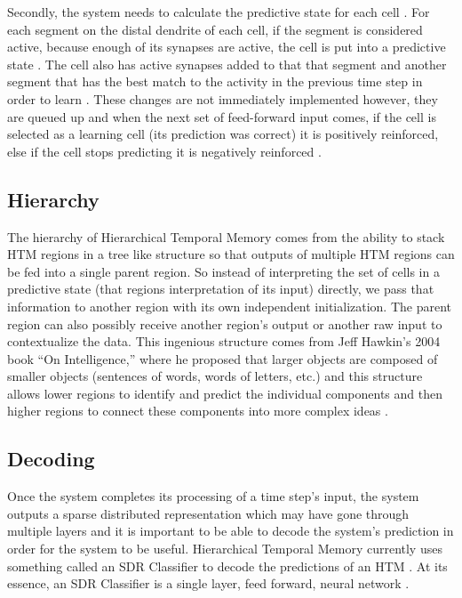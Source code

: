 \documentclass[fleqn,notitlepage,minimal]{article}
\begin{document}
	Secondly, the system needs to calculate the predictive state for each cell \cite{Whitepaper}. For each segment on the distal dendrite of each cell, if the segment is considered active, because enough of its synapses are active, the cell is put into a predictive state \cite{Principles}. The cell also has active synapses added to that that segment and another segment that has the best match to the activity in the previous time step in order to learn \cite{Whitepaper}. These changes are not immediately implemented however, they are queued up and when the next set of feed-forward input comes, if the cell is selected as a learning cell (its prediction was correct) it is positively reinforced, else if the cell stops predicting it is negatively reinforced \cite{Whitepaper}.
	
	\subsection{Hierarchy}
	
	The hierarchy of Hierarchical Temporal Memory comes from the ability to stack HTM regions in a tree like structure so that outputs of multiple HTM regions can be fed into a single parent region. So instead of interpreting the set of cells in a predictive state (that regions interpretation of its input) directly, we pass that information to another region with its own independent initialization. The parent region can also possibly receive another region's output or another raw input to contextualize the data. This ingenious structure comes from Jeff Hawkin's 2004 book ``On Intelligence,'' where he proposed that larger objects are composed of smaller objects (sentences of words, words of letters, etc.) and this structure allows lower regions to identify and predict the individual components and then higher regions to connect these components into more complex ideas \cite{Evaluation}.
	
	\subsection{Decoding}
	
	Once the system completes its processing of a time step's input, the system outputs a sparse distributed representation which may have gone through multiple layers and it is important to be able to decode the system's prediction in order for the system to be useful. Hierarchical Temporal Memory currently uses something called an SDR Classifier to decode the predictions of an HTM \cite{Dillon}. At its essence, an SDR Classifier is a single layer, feed forward, neural network \cite{Dillon}.
\end{document}
